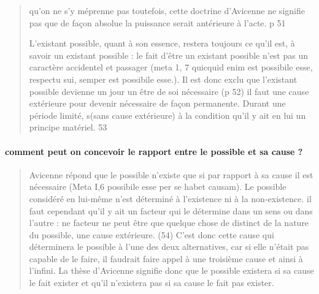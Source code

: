 \begin{quote}
   qu'on ne s'y méprenne pas toutefois, cette doctrine d'Avicenne ne signifie pas que de façon absolue la puissance serait antérieure à l'acte. p 51
   
   L'existant possible, quant à son essence, restera toujours ce qu'il est, à savoir un existant possible : le fait d'être un existant possible n'est pas un caractère accidentel et passager (meta 1, 7 quicquid enim est possibile esse, respectu sui, semper est possibile esse.). Il est donc exclu que l'existant possible devienne un jour un être de soi nécessaire (p 52)
   il faut une cause extérieure pour devenir nécessaire de façon permanente. Durant une période limité, s(sans cause extérieure) à la condition qu'il y ait en lui un principe matériel. 53
\end{quote}

\paragraph{comment peut on concevoir le rapport entre le possible et sa cause ?}
\begin{quote}
    Avicenne répond que le possible n'existe que si par rapport à sa cause il est nécessaire (Meta I,6 possibile esse per se habet causam). Le possible considéré en lui-même n'est déterminé à l'existence ni à la non-existence. il faut cependant qu'il y ait un facteur qui le détermine dans un sens ou dans l'autre : ne facteur ne peut être que quelque chose de distinct de la nature du possible, une cause extérieure. (54)
    C'est donc cette cause qui déterminera le possible à l'une des deux alternatives, car si elle n'était pas capable de le faire, il faudrait faire appel à une troisième cause et ainsi à l'infini. 
    La thèse d'Avicenne signifie donc que le possible existera si sa cause le fait exister et qu'il n'existera pas si sa cause le fait pas exister.

\end{quote}
